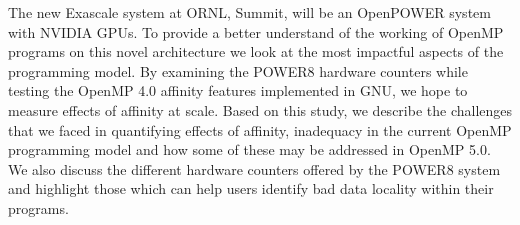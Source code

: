 The new Exascale system at ORNL, Summit, will be an OpenPOWER system with NVIDIA GPUs. To provide a better understand of the working of OpenMP 
programs on this novel architecture we look at the most impactful aspects of the programming model. By examining the POWER8 hardware counters while testing the OpenMP 4.0 affinity features implemented in GNU, we hope to measure effects of affinity at scale. Based on this study, we describe the challenges that we faced in quantifying effects of affinity, inadequacy in the current OpenMP programming model and how some of these may be addressed in OpenMP 5.0. We also discuss the different hardware counters offered by the POWER8 system and highlight those which can help users identify bad data locality within their programs.
